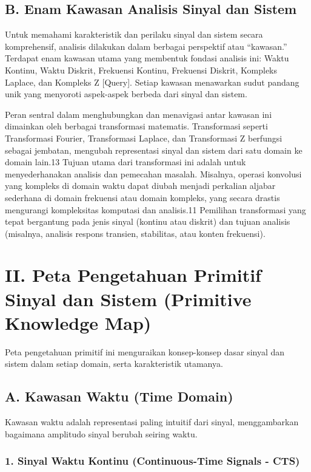 \documentclass[
  letterpaper,
  DIV=11,
  numbers=noendperiod]{scrreprt}
\begin{document}
\subsection{B. Enam Kawasan Analisis Sinyal dan
Sistem}\label{b.-enam-kawasan-analisis-sinyal-dan-sistem}

Untuk memahami karakteristik dan perilaku sinyal dan sistem secara
komprehensif, analisis dilakukan dalam berbagai perspektif atau
``kawasan.'' Terdapat enam kawasan utama yang membentuk fondasi analisis
ini: Waktu Kontinu, Waktu Diskrit, Frekuensi Kontinu, Frekuensi Diskrit,
Kompleks Laplace, dan Kompleks Z {[}Query{]}. Setiap kawasan menawarkan
sudut pandang unik yang menyoroti aspek-aspek berbeda dari sinyal dan
sistem.

Peran sentral dalam menghubungkan dan menavigasi antar kawasan ini
dimainkan oleh berbagai transformasi matematis. Transformasi seperti
Transformasi Fourier, Transformasi Laplace, dan Transformasi Z berfungsi
sebagai jembatan, mengubah representasi sinyal dan sistem dari satu
domain ke domain lain.13 Tujuan utama dari transformasi ini adalah untuk
menyederhanakan analisis dan pemecahan masalah. Misalnya, operasi
konvolusi yang kompleks di domain waktu dapat diubah menjadi perkalian
aljabar sederhana di domain frekuensi atau domain kompleks, yang secara
drastis mengurangi kompleksitas komputasi dan analisis.11 Pemilihan
transformasi yang tepat bergantung pada jenis sinyal (kontinu atau
diskrit) dan tujuan analisis (misalnya, analisis respons transien,
stabilitas, atau konten frekuensi).

\section{II. Peta Pengetahuan Primitif Sinyal dan Sistem (Primitive
Knowledge
Map)}\label{ii.-peta-pengetahuan-primitif-sinyal-dan-sistem-primitive-knowledge-map}

Peta pengetahuan primitif ini menguraikan konsep-konsep dasar sinyal dan
sistem dalam setiap domain, serta karakteristik utamanya.

\subsection{A. Kawasan Waktu (Time
Domain)}\label{a.-kawasan-waktu-time-domain}

Kawasan waktu adalah representasi paling intuitif dari sinyal,
menggambarkan bagaimana amplitudo sinyal berubah seiring waktu.

\subsubsection{1. Sinyal Waktu Kontinu (Continuous-Time Signals -
CTS)}\label{sinyal-waktu-kontinu-continuous-time-signals---cts}
\end{document}
